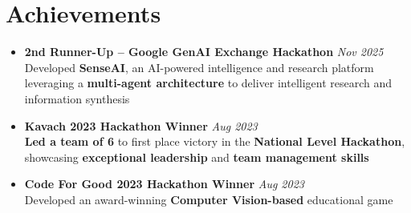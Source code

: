 \section{Achievements}
\begin{itemize}
    \item \textbf{2nd Runner-Up -- Google GenAI Exchange Hackathon} \hfill \textit{Nov 2025} \\
          Developed \textbf{SenseAI}, an AI-powered intelligence and research platform leveraging a \textbf{multi-agent architecture} to deliver intelligent research and information synthesis

    \item \textbf{Kavach 2023 Hackathon Winner} \hfill \textit{Aug 2023} \\
          \textbf{Led a team of 6} to first place victory in the \textbf{National Level Hackathon}, showcasing \textbf{exceptional leadership} and \textbf{team management skills}

    \item \textbf{Code For Good 2023 Hackathon Winner} \hfill \textit{Aug 2023} \\
          Developed an award-winning \textbf{Computer Vision-based} educational game
\end{itemize}